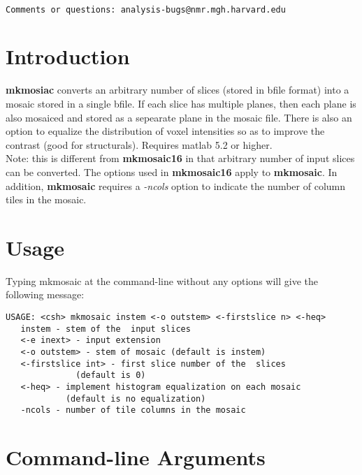 \documentclass[10pt]{article}
\begin{document}
\begin{Large}
 \\
\end{Large}

\noindent 
\begin{verbatim}
Comments or questions: analysis-bugs@nmr.mgh.harvard.edu
\end{verbatim}

\section{Introduction}
{\bf mkmosiac} converts an arbitrary number of slices (stored in bfile
format) into a mosaic stored in a single bfile.  If each slice has
multiple planes, then each plane is also mosaiced and stored as a
sepearate plane in the mosaic file.  There is also an option to
equalize the distribution of voxel intensities so as to improve the
contrast (good for structurals). Requires matlab 5.2 or higher.\\

Note: this is different from {\bf mkmosaic16} in that arbitrary number
of input slices can be converted.  The options used in {\bf
mkmosaic16} apply to {\bf mkmosaic}.  In addition, {\bf mkmosaic}
requires a {\em -ncols} option to indicate the number of column tiles
in the mosaic.\\

\section{Usage}
Typing mkmosaic at the command-line without any options will give the
following message:\\ 

\begin{small}
\begin{verbatim}
USAGE: <csh> mkmosaic instem <-o outstem> <-firstslice n> <-heq>
   instem - stem of the  input slices
   <-e inext> - input extension 
   <-o outstem> - stem of mosaic (default is instem)
   <-firstslice int> - first slice number of the  slices 
              (default is 0)
   <-heq> - implement histogram equalization on each mosaic
            (default is no equalization)
   -ncols - number of tile columns in the mosaic
\end{verbatim}
\end{small}

\section{Command-line Arguments}
\end{document}
